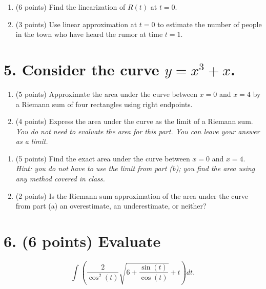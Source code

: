 \documentclass[12pt]{article}
\begin{document}
\begin{enumerate}[label=(\alph*)]
    \item (6 points) Find the linearization of $R(t)$ at $t=0$.
    
    \vspace{6cm}
    
    \item (3 points) Use linear approximation at $t=0$ to estimate the number of people in the town who have heard the rumor at time $t=1$.
    
    \vspace{4cm}

\end{enumerate}

\newpage

\section*{5. Consider the curve $y=x^3+x$.}

\begin{enumerate}[label=(\alph*)]
    \item (5 points) Approximate the area under the curve between $x=0$ and $x=4$ by a Riemann sum of four rectangles using right endpoints.
    
    \vspace{5cm}
    
    \item (4 points) Express the area under the curve as the limit of a Riemann sum.
    \textit{You do not need to evaluate the area for this part. You can leave your answer as a limit.}
    
    \vspace{5cm}
    
\end{enumerate}

\newpage

\begin{enumerate}[label=(\alph*)]\addtocounter{enumi}{2} %
    \item (5 points) Find the exact area under the curve between $x=0$ and $x=4$.
    \textit{Hint: you do not have to use the limit from part (b); you find the area using any method covered in class.}
    
    \vspace{5cm}
    
    \item (2 points) Is the Riemann sum approximation of the area under the curve from part (a) an overestimate, an underestimate, or neither?
    
    \vspace{4cm}
    
\end{enumerate}

\newpage

\section*{6. (6 points) Evaluate}
\[ \int \left( \frac{2}{\cos^2(t)} \sqrt{6 + \frac{\sin(t)}{\cos(t)}} + t \right) dt. \]

\vspace{10cm}
\end{document}
